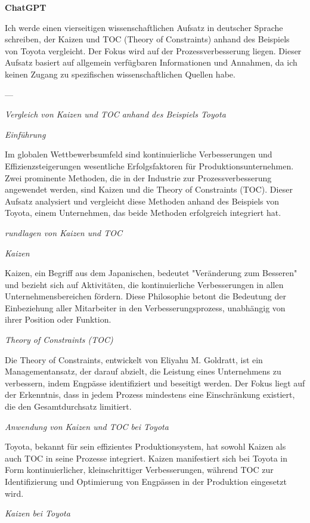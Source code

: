 \textbf{ChatGPT}

Ich werde einen vierseitigen wissenschaftlichen Aufsatz in deutscher Sprache schreiben, der Kaizen und TOC (Theory of Constraints) anhand des Beispiels von Toyota vergleicht. Der Fokus wird auf der Prozessverbesserung liegen. Dieser Aufsatz basiert auf allgemein verfügbaren Informationen und Annahmen, da ich keinen Zugang zu spezifischen wissenschaftlichen Quellen habe. 

---

\textit{Vergleich von Kaizen und TOC anhand des Beispiels Toyota}

\textit{Einführung}

Im globalen Wettbewerbsumfeld sind kontinuierliche Verbesserungen und Effizienzsteigerungen wesentliche Erfolgsfaktoren für Produktionsunternehmen. Zwei prominente Methoden, die in der Industrie zur Prozessverbesserung angewendet werden, sind Kaizen und die Theory of Constraints (TOC). Dieser Aufsatz analysiert und vergleicht diese Methoden anhand des Beispiels von Toyota, einem Unternehmen, das beide Methoden erfolgreich integriert hat.

\textit{rundlagen von Kaizen und TOC}

\textit{Kaizen}

Kaizen, ein Begriff aus dem Japanischen, bedeutet "Veränderung zum Besseren" und bezieht sich auf Aktivitäten, die kontinuierliche Verbesserungen in allen Unternehmensbereichen fördern. Diese Philosophie betont die Bedeutung der Einbeziehung aller Mitarbeiter in den Verbesserungsprozess, unabhängig von ihrer Position oder Funktion.

\textit{Theory of Constraints (TOC)}

Die Theory of Constraints, entwickelt von Eliyahu M. Goldratt, ist ein Managementansatz, der darauf abzielt, die Leistung eines Unternehmens zu verbessern, indem Engpässe identifiziert und beseitigt werden. Der Fokus liegt auf der Erkenntnis, dass in jedem Prozess mindestens eine Einschränkung existiert, die den Gesamtdurchsatz limitiert.

\textit{Anwendung von Kaizen und TOC bei Toyota}

Toyota, bekannt für sein effizientes Produktionsystem, hat sowohl Kaizen als auch TOC in seine Prozesse integriert. Kaizen manifestiert sich bei Toyota in Form kontinuierlicher, kleinschrittiger Verbesserungen, während TOC zur Identifizierung und Optimierung von Engpässen in der Produktion eingesetzt wird.

\textit{Kaizen bei Toyota}

